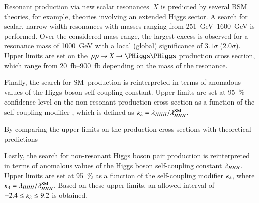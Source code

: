 Resonant \HH production via new scalar resonances~$X$ is predicted by several
BSM theories, for example, theories involving an extended Higgs sector. A search
for scalar, narrow-width resonances with masses ranging from
\SIrange{251}{1600}{\GeV} is performed. Over the considered mass range, the
largest excess is observed for a resonance mass of \SI{1000}{\GeV} with a local
(global) significance of $3.1\sigma$ ($2.0\sigma$). Upper limits are set on the
$\pp \to X \to \HH$ production cross section, which range from
\SIrange{20}{900}{\femto\barn} depending on the mass of the resonance.

Finally, the search for SM~\HH production is reinterpreted in terms of anomalous
values of the Higgs boson self-coupling constant. Upper limits are set at
\SI{95}{\percent} confidence level on the non-resonant \HH production cross
section as a function of the self-coupling modifier \klambda, which is defined
as $\kappa_{\lambda} = \lambda_{HHH} / \lambda_{HHH}^{\text{SM}}$.



By comparing the upper limits on the production cross sections with theoretical
predictions




\vspace{1em}


Lastly, the search for non-resonant Higgs boson pair production is reinterpreted
in terms of anomalous values of the Higgs boson self-coupling constant
$\lambda_{HHH}$. Upper limits are set at \SI{95}{\percent} as a function of the
self-coupling modifier $\kappa_{\lambda}$, where
$\kappa_{\lambda} = \lambda_{HHH} / \lambda_{HHH}^{\text{SM}}$. Based on these upper limits,
an allowed \klambda interval of $\num{-2.4} \leq \kappa_{\lambda} \leq 9.2$ is obtained.



%


%


